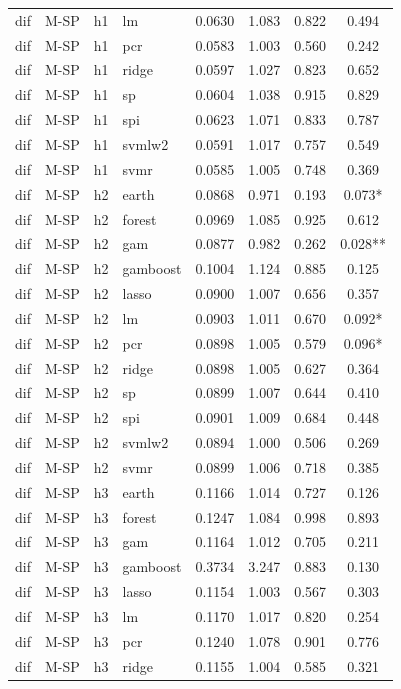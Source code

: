 \begin{ThreePartTable}
\begin{longtable}[t]{llclcccc}
dif & M-SP & h1 & lm & 0.0630 & 1.083 & 0.822 & 0.494\\
dif & M-SP & h1 & pcr & 0.0583 & 1.003 & 0.560 & 0.242\\
dif & M-SP & h1 & ridge & 0.0597 & 1.027 & 0.823 & 0.652\\
dif & M-SP & h1 & sp & 0.0604 & 1.038 & 0.915 & 0.829\\
dif & M-SP & h1 & spi & 0.0623 & 1.071 & 0.833 & 0.787\\
dif & M-SP & h1 & svmlw2 & 0.0591 & 1.017 & 0.757 & 0.549\\
dif & M-SP & h1 & svmr & 0.0585 & 1.005 & 0.748 & 0.369\\
\addlinespace
dif & M-SP & h2 & earth & 0.0868 & 0.971 & 0.193 & 0.073*\\
dif & M-SP & h2 & forest & 0.0969 & 1.085 & 0.925 & 0.612\\
dif & M-SP & h2 & gam & 0.0877 & 0.982 & 0.262 & 0.028**\\
dif & M-SP & h2 & gamboost & 0.1004 & 1.124 & 0.885 & 0.125\\
dif & M-SP & h2 & lasso & 0.0900 & 1.007 & 0.656 & 0.357\\
dif & M-SP & h2 & lm & 0.0903 & 1.011 & 0.670 & 0.092*\\
dif & M-SP & h2 & pcr & 0.0898 & 1.005 & 0.579 & 0.096*\\
dif & M-SP & h2 & ridge & 0.0898 & 1.005 & 0.627 & 0.364\\
dif & M-SP & h2 & sp & 0.0899 & 1.007 & 0.644 & 0.410\\
dif & M-SP & h2 & spi & 0.0901 & 1.009 & 0.684 & 0.448\\
dif & M-SP & h2 & svmlw2 & 0.0894 & 1.000 & 0.506 & 0.269\\
dif & M-SP & h2 & svmr & 0.0899 & 1.006 & 0.718 & 0.385\\
\addlinespace
dif & M-SP & h3 & earth & 0.1166 & 1.014 & 0.727 & 0.126\\
dif & M-SP & h3 & forest & 0.1247 & 1.084 & 0.998 & 0.893\\
dif & M-SP & h3 & gam & 0.1164 & 1.012 & 0.705 & 0.211\\
dif & M-SP & h3 & gamboost & 0.3734 & 3.247 & 0.883 & 0.130\\
dif & M-SP & h3 & lasso & 0.1154 & 1.003 & 0.567 & 0.303\\
dif & M-SP & h3 & lm & 0.1170 & 1.017 & 0.820 & 0.254\\
dif & M-SP & h3 & pcr & 0.1240 & 1.078 & 0.901 & 0.776\\
dif & M-SP & h3 & ridge & 0.1155 & 1.004 & 0.585 & 0.321\\

\end{longtable}
\end{ThreePartTable}
